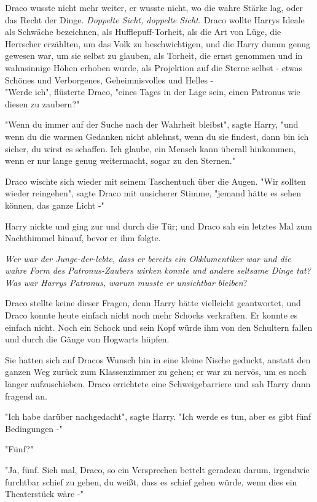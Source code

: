 {Draco wusste nicht mehr weiter, er wusste nicht, wo die wahre Stärke lag, oder das Recht der Dinge. \emph{Doppelte Sicht, doppelte Sicht.} Draco wollte Harrys Ideale als Schwäche bezeichnen, als Hufflepuff-Torheit, als die Art von Lüge, die Herrscher erzählten, um das Volk zu beschwichtigen, und die Harry dumm genug gewesen war, um sie selbst zu glauben, als Torheit, die ernst genommen und in wahnsinnige Höhen erhoben wurde, als Projektion auf die Sterne selbst - etwas Schönes und Verborgenes, Geheimnisvolles und Helles -\\ "Werde ich", flüsterte Draco, "eines Tages in der Lage sein, einen Patronus wie diesen zu zaubern?"

"Wenn du immer auf der Suche nach der Wahrheit bleibst", sagte Harry, "und wenn du die warmen Gedanken nicht ablehnst, wenn du sie findest, dann bin ich sicher, du wirst es schaffen. Ich glaube, ein Mensch kann überall hinkommen, wenn er nur lange genug weitermacht, sogar zu den Sternen."

Draco wischte sich wieder mit seinem Taschentuch über die Augen. "Wir sollten wieder reingehen", sagte Draco mit unsicherer Stimme, "jemand hätte es sehen können, das ganze Licht -"

Harry nickte und ging zur und durch die Tür; und Draco sah ein letztes Mal zum Nachthimmel hinauf, bevor er ihm folgte.

\emph{Wer war der Junge-der-lebte, dass er bereits ein Okklumentiker war und die wahre Form des Patronus-Zaubers wirken konnte und andere seltsame Dinge tat? Was war Harrys Patronus, warum musste er unsichtbar bleiben}?

Draco stellte keine dieser Fragen, denn Harry hätte vielleicht geantwortet, und Draco konnte heute einfach nicht noch mehr Schocks verkraften. Er konnte es einfach nicht. Noch ein Schock und sein Kopf würde ihm von den Schultern fallen und durch die Gänge von Hogwarts hüpfen.

Sie hatten sich auf Dracos Wunsch hin in eine kleine Nische geduckt, anstatt den ganzen Weg zurück zum Klassenzimmer zu gehen; er war zu nervös, um es noch länger aufzuschieben. Draco errichtete eine Schweigebarriere und sah Harry dann fragend an.

"Ich habe darüber nachgedacht", sagte Harry. "Ich werde es tun, aber es gibt fünf Bedingungen -"

"Fünf?"

"Ja, fünf. Sieh mal, Draco, so ein Versprechen bettelt geradezu darum, irgendwie furchtbar schief zu gehen, du weißt, dass es schief gehen würde, wenn dies ein Theaterstück wäre -"

}
